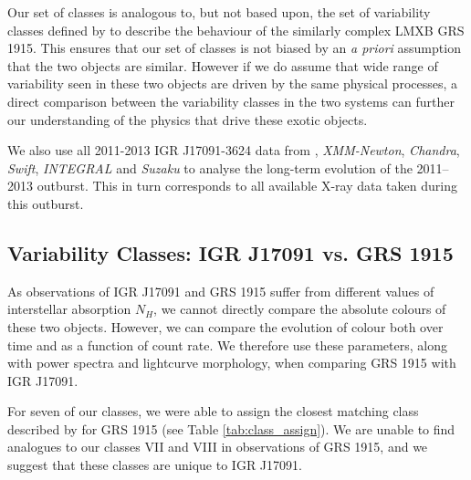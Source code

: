 \par Our set of classes is analogous to, but not based upon, the set of variability classes defined by \citealt{Belloni_GRS_MI} to describe the behaviour of the similarly complex LMXB GRS 1915.  This ensures that our set of classes is not biased by an \textit{a priori} assumption that the two objects are similar.  However if we do assume that wide range of variability seen in these two objects are driven by the same physical processes, a direct comparison between the variability classes in the two systems can further our understanding of the physics that drive these exotic objects.
\par We also use all 2011-2013 IGR J17091-3624 data from \rxte , \textit{XMM-Newton}, \textit{Chandra}, \textit{Swift}, \textit{INTEGRAL} and \textit{Suzaku} to analyse the long-term evolution of the 2011--2013 outburst.  This in turn corresponds to all available X-ray data taken during this outburst.

\subsection{Variability Classes: IGR J17091 vs. GRS 1915}

\par As observations of IGR J17091 and GRS 1915 suffer from different values of interstellar absorption $N_H$, we cannot directly compare the absolute colours of these two objects.  However, we can compare the evolution of colour both over time and as a function of count rate.  We therefore use these parameters, along with power spectra and lightcurve morphology, when comparing GRS 1915 with IGR J17091.
\par For seven of our classes, we were able to assign the closest matching class described by \citealt{Belloni_GRS_MI} for GRS 1915 (see Table \ref{tab:class_assign}).  We are unable to find analogues to our classes VII and VIII in observations of GRS 1915, and we suggest that these classes are unique to IGR J17091.

